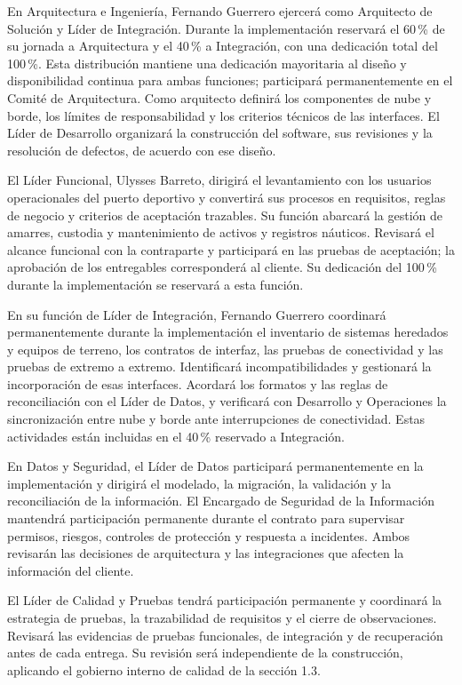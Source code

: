 En Arquitectura e Ingeniería, Fernando Guerrero ejercerá como Arquitecto de Solución y Líder de Integración. Durante la implementación reservará el 60\,\% de su jornada a Arquitectura y el 40\,\% a Integración, con una dedicación total del 100\,\%. Esta distribución mantiene una dedicación mayoritaria al diseño y disponibilidad continua para ambas funciones; participará permanentemente en el Comité de Arquitectura. Como arquitecto definirá los componentes de nube y borde, los límites de responsabilidad y los criterios técnicos de las interfaces. El Líder de Desarrollo organizará la construcción del software, sus revisiones y la resolución de defectos, de acuerdo con ese diseño.

El Líder Funcional, Ulysses Barreto, dirigirá el levantamiento con los usuarios operacionales del puerto deportivo y convertirá sus procesos en requisitos, reglas de negocio y criterios de aceptación trazables. Su función abarcará la gestión de amarres, custodia y mantenimiento de activos y registros náuticos. Revisará el alcance funcional con la contraparte y participará en las pruebas de aceptación; la aprobación de los entregables corresponderá al cliente. Su dedicación del 100\,\% durante la implementación se reservará a esta función.

En su función de Líder de Integración, Fernando Guerrero coordinará permanentemente durante la implementación el inventario de sistemas heredados y equipos de terreno, los contratos de interfaz, las pruebas de conectividad y las pruebas de extremo a extremo. Identificará incompatibilidades y gestionará la incorporación de esas interfaces. Acordará los formatos y las reglas de reconciliación con el Líder de Datos, y verificará con Desarrollo y Operaciones la sincronización entre nube y borde ante interrupciones de conectividad. Estas actividades están incluidas en el 40\,\% reservado a Integración.

En Datos y Seguridad, el Líder de Datos participará permanentemente en la implementación y dirigirá el modelado, la migración, la validación y la reconciliación de la información. El Encargado de Seguridad de la Información mantendrá participación permanente durante el contrato para supervisar permisos, riesgos, controles de protección y respuesta a incidentes. Ambos revisarán las decisiones de arquitectura y las integraciones que afecten la información del cliente.

El Líder de Calidad y Pruebas tendrá participación permanente y coordinará la estrategia de pruebas, la trazabilidad de requisitos y el cierre de observaciones. Revisará las evidencias de pruebas funcionales, de integración y de recuperación antes de cada entrega. Su revisión será independiente de la construcción, aplicando el gobierno interno de calidad de la sección 1.3.

